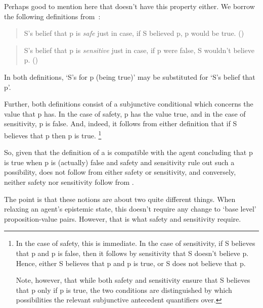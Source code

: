 \begin{note}
  {
    \color{red}
    Perhaps good to mention here that \zS{} doesn't have this property either.
  }
  We borrow the following definitions from~\citeauthor{Zalabardo:2017td}:

  \begin{quote}
    S's belief that p is \emph{safe} just in case, if S believed p, p would be true.\newline
    \mbox{}\hfill\mbox{(\citeyear[1]{Zalabardo:2017td})}
  \end{quote}

  \begin{quote}
    S's belief that p is \emph{sensitive} just in case, if p were false, S wouldn't believe p.\nolinebreak
    \mbox{}\hfill\mbox{(\citeyear[2]{Zalabardo:2017td})}
  \end{quote}

  In both definitions, `S's \support{} for p (being true)' may be substituted for `S's belief that p'.

  Further, both definitions consist of a subjunctive conditional which concerns the value that p has.
  In the case of safety, p has the value true, and in the case of sensitivity, p is false.
  And, indeed, it follows from either definition that if S believes that p then p is true.\nolinebreak
  \footnote{
    In the case of safety, this is immediate.
    In the case of sensitivity, if S believes that p and p is false, then it follows by sensitivity that S doesn't believe p.
    Hence, either S believes that p and p is true, or S does not believe that p.

    Note, however, that while both safety and sensitivity ensure that S believes that p only if p is true, the two conditions are distinguished by which possibilities the relevant subjunctive antecedent quantifiers over.
  }

  So, given that the definition of a \sink{} is compatible with the agent concluding that p is true when p is (actually) false and safety and sensitivity rule out such a possibility, \ideaS{} does not follow from either safety or sensitivity, and conversely, neither safety nor sensitivity follow from \ideaS{}.
\end{note}

\begin{note}
  \color{red} The point is that these notions are about two quite different things.
  When relaxing an agent's epistemic state, this doesn't require any change to `base level' proposition-value pairs.
  However, that is what safety and sensitivity require.
\end{note}

